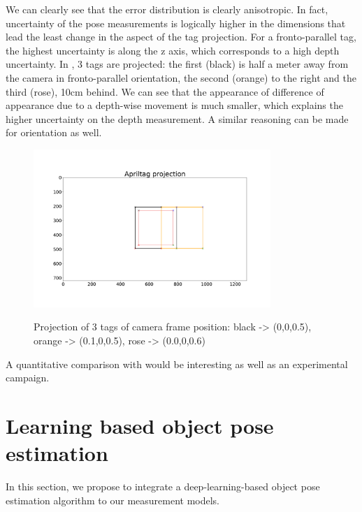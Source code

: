 We can clearly see that the error distribution is clearly anisotropic. In fact, uncertainty of the pose measurements
is logically higher in the dimensions that lead the least change in the aspect of the tag projection. For a fronto-parallel tag, the highest 
uncertainty is along the z axis, which corresponds to a high depth uncertainty.
In , 3 tags are projected: the first (black) is half a meter away from the camera in fronto-parallel orientation, the second (orange)
to the right and the third (rose), 10cm behind. We can see that the appearance of difference of appearance due to a depth-wise movement is much smaller, which 
explains the higher uncertainty on the depth measurement. A similar reasoning can be made for orientation as well. 

\begin{figure}[h]
    \centering
    \includegraphics[width=0.8\textwidth]{figures/apriltag_proj.pdf}
    \label{fig:apriltag_proj}
    \caption{Projection of 3 tags of camera frame position: black -> (0,0,0.5), orange -> (0.1,0,0.5), rose -> (0.0,0,0.6)}
\end{figure}

A quantitative comparison with \cite{urban2016mlpnp} would be interesting as well as an experimental campaign.



%
\section{Learning based object pose estimation}
In this section, we propose to integrate a deep-learning-based object pose estimation algorithm \cite{labbe2020cosypose} to our measurement models. 


